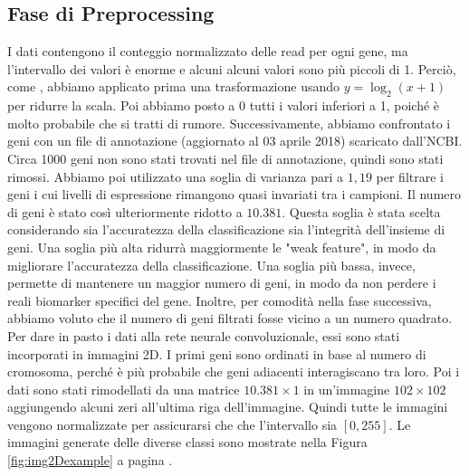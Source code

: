 \subsection{Fase di Preprocessing}
I dati contengono il conteggio normalizzato delle read per ogni gene, ma l'intervallo dei valori è enorme e alcuni
alcuni valori sono più piccoli di 1.
Perciò, come \cite{lyu2018deep}, abbiamo applicato prima una trasformazione usando $y = \log_2 (x + 1)$ per ridurre la
scala. Poi abbiamo posto a 0 tutti i valori inferiori a 1, poiché è molto probabile che si tratti di rumore.
Successivamente, abbiamo confrontato i geni con un file di annotazione (aggiornato al 03 aprile 2018) scaricato
dall'NCBI. Circa 1000 geni non sono stati trovati nel file di annotazione, quindi sono stati rimossi. 
Abbiamo poi utilizzato una soglia di varianza pari a $1,19$ per filtrare i geni i cui livelli di espressione 
rimangono quasi invariati tra i campioni. Il numero di geni è stato così ulteriormente ridotto a $10.381$. 
Questa soglia è stata scelta considerando sia l'accuratezza della classificazione sia l'integrità
dell'insieme di geni. Una soglia più alta ridurrà maggiormente le "weak feature", in modo da migliorare l'accuratezza
della classificazione. Una soglia più bassa, invece, permette di mantenere un maggior numero di geni, in modo da 
non perdere i reali biomarker specifici del gene. Inoltre, per comodità nella fase successiva, abbiamo voluto che il
numero di geni filtrati fosse vicino a un numero quadrato.
Per dare in pasto i dati alla rete neurale convoluzionale, essi sono stati incorporati in immagini 2D. I primi geni 
sono ordinati in base al numero di cromosoma, perché è più probabile che geni adiacenti interagiscano tra loro. 
Poi i dati sono stati rimodellati da una matrice $10.381 \times 1$ in un'immagine $102 \times 102$ aggiungendo 
alcuni zeri all'ultima riga dell'immagine. Quindi tutte le immagini vengono normalizzate per assicurarsi che
che l'intervallo sia $[0, 255]$. Le immagini generate delle diverse classi sono mostrate nella Figura
\ref{fig:img2Dexample} a pagina \pageref{fig:img2Dexample}.
